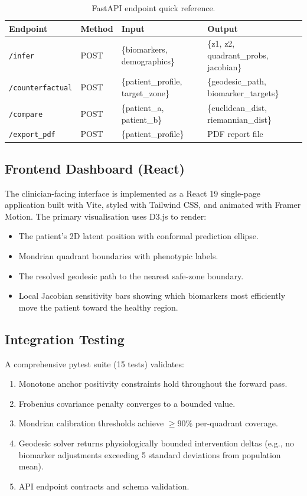 \documentclass[12pt,a4paper,oneside]{report}
\begin{document}
\begin{table}[H]
\centering
\caption{FastAPI endpoint quick reference.}
\label{tab:api}
\begin{tabular}{@{}llll@{}}
\toprule
\textbf{Endpoint} & \textbf{Method} & \textbf{Input} & \textbf{Output} \\ \midrule
\texttt{/infer}         & POST & \{biomarkers, demographics\} & \{z1, z2, quadrant\_probs, jacobian\} \\
\texttt{/counterfactual} & POST & \{patient\_profile, target\_zone\} & \{geodesic\_path, biomarker\_targets\} \\
\texttt{/compare}       & POST & \{patient\_a, patient\_b\} & \{euclidean\_dist, riemannian\_dist\} \\
\texttt{/export\_pdf}   & POST & \{patient\_profile\}          & PDF report file \\ \bottomrule
\end{tabular}
\end{table}

\subsection{Frontend Dashboard (React)}

The clinician-facing interface is implemented as a React 19 single-page application built with Vite, styled with Tailwind CSS, and animated with Framer Motion. The primary visualisation uses D3.js to render:
\begin{itemize}[leftmargin=*]
    \item The patient's 2D latent position with conformal prediction ellipse.
    \item Mondrian quadrant boundaries with phenotypic labels.
    \item The resolved geodesic path to the nearest safe-zone boundary.
    \item Local Jacobian sensitivity bars showing which biomarkers most efficiently move the patient toward the healthy region.
\end{itemize}

\subsection{Integration Testing}

A comprehensive pytest suite (15 tests) validates:
\begin{enumerate}[leftmargin=*]
    \item Monotone anchor positivity constraints hold throughout the forward pass.
    \item Frobenius covariance penalty converges to a bounded value.
    \item Mondrian calibration thresholds achieve $\geq 90\%$ per-quadrant coverage.
    \item Geodesic solver returns physiologically bounded intervention deltas (e.g., no biomarker adjustments exceeding 5 standard deviations from population mean).
    \item API endpoint contracts and schema validation.
\end{enumerate}
\end{document}
